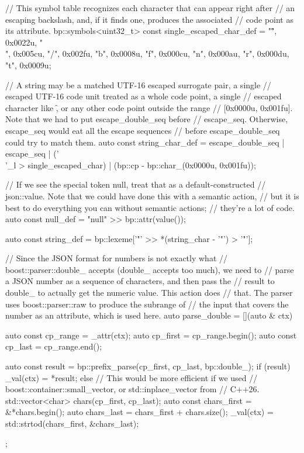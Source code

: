 \begin{code}
{    // This symbol table recognizes each character that can appear right after
    // an escaping backslash, and, if it finds one, produces the associated
    // code point as its attribute.
    bp::symbols<uint32_t> const single_escaped_char_def = {
        {"\"", 0x0022u},
        {"\\", 0x005cu},
        {"/", 0x002fu},
        {"b", 0x0008u},
        {"f", 0x000cu},
        {"n", 0x000au},
        {"r", 0x000du},
        {"t", 0x0009u}};

    // A string may be a matched UTF-16 escaped surrogate pair, a single
    // escaped UTF-16 code unit treated as a whole code point, a single
    // escaped character like \f, or any other code point outside the range
    // [0x0000u, 0x001fu].  Note that we had to put escape_double_seq before
    // escape_seq.  Otherwise, escape_seq would eat all the escape sequences
    // before escape_double_seq could try to match them.
    auto const string_char_def = escape_double_seq | escape_seq |
                                 ('\\'_l > single_escaped_char) |
                                 (bp::cp - bp::char_(0x0000u, 0x001fu));

    // If we see the special token null, treat that as a default-constructed
    // json::value.  Note that we could have done this with a semantic action,
    // but it is best to do everything you can without semantic actions;
    // they're a lot of code.
    auto const null_def = "null" >> bp::attr(value());

    auto const string_def = bp::lexeme['"' >> *(string_char - '"') > '"'];

    // Since the JSON format for numbers is not exactly what
    // boost::parser::double_ accepts (double_ accepts too much), we need to
    // parse a JSON number as a sequence of characters, and then pass the
    // result to double_ to actually get the numeric value.  This action does
    // that.  The parser uses boost::parser::raw to produce the subrange of
    // the input that covers the number as an attribute, which is used here.
    auto parse_double = [](auto & ctx) {
        auto const cp_range = _attr(ctx);
        auto cp_first = cp_range.begin();
        auto const cp_last = cp_range.end();

        auto const result = bp::prefix_parse(cp_first, cp_last, bp::double_);
        if (result) {
            _val(ctx) = *result;
        } else {
            // This would be more efficient if we used
            // boost::container::small_vector, or std::inplace_vector from
            // C++26.
            std::vector<char> chars(cp_first, cp_last);
            auto const chars_first = &*chars.begin();
            auto chars_last = chars_first + chars.size();
            _val(ctx) = std::strtod(chars_first, &chars_last);
        }
    };

}
\end{code}
